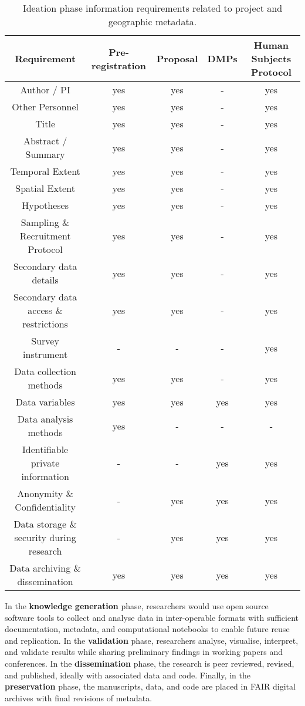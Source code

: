 \documentclass{isprs} %
\begin{document}
\begin{table*}[h]
	\centering
		\begin{tabular}{|c|c|c|c|c|}\hline
		   Requirement&Pre-registration&Proposal&DMPs&Human Subjects Protocol\\\hline
		     Author / PI                            & yes & yes & - & yes \\
		     Other Personnel                        & yes & yes & - & yes \\
    		 Title                                  & yes & yes & - & yes \\
    		 Abstract / Summary                     & yes & yes & - & yes \\
    		 Temporal Extent                        & yes & yes & - & yes \\
    		 Spatial Extent                         & yes & yes & - & yes \\
    		 Hypotheses                             & yes & yes & - & yes \\
    		 Sampling \& Recruitment Protocol        & yes & yes & - & yes \\
    		 Secondary data details                 & yes & yes & - & yes \\
    		 Secondary data access \& restrictions   & yes & yes & - & yes \\
    		 Survey instrument                      & - & - & - & yes \\
    		 Data collection methods                & yes & yes & - & yes \\
    		 Data variables                         & yes & yes & yes & yes \\
    		 Data analysis methods                  & yes & - & - & - \\
    		 Identifiable private information       & - & - & yes & yes \\
    		 Anonymity \& Confidentiality            & - & yes & yes & yes \\
    		 Data storage \& security during research& - & yes & yes & yes \\
    		 Data archiving \& dissemination         & yes & yes & yes & yes \\\hline
		\end{tabular}
	\caption{Ideation phase information requirements related to project and geographic metadata.}
\label{tab:Ideation_Info}
\end{table*}



In the \textbf{knowledge generation} phase, researchers would use open source software tools to collect and analyse data in inter-operable formats with sufficient documentation, metadata, and computational notebooks to enable future reuse and replication. 
In the \textbf{validation} phase, researchers analyse, visualise, interpret, and validate results while sharing preliminary findings in working papers and conferences.
In the \textbf{dissemination} phase, the research is peer reviewed, revised, and published, ideally with associated data and code.
Finally, in the \textbf{preservation} phase, the manuscripts, data, and code are placed in FAIR digital archives with final revisions of metadata.
\end{document}
